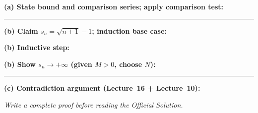 \documentclass[12pt]{article}
\newcommand{\writespace}[1]{\vspace{#1}}
\begin{document}
\newpage

\begin{tcolorbox}[
  enhanced, breakable,
  colback  = pass4purple,
  colframe = purple!55!black,
  fonttitle = \bfseries,
  title = {Pass 4 \enspace\textbf{--}\enspace Skeleton Proof}
]
\noindent\textbf{(a) State bound and comparison series; apply comparison test:}\par
\writespace{2.2cm}

\noindent\rule{\linewidth}{0.4pt}\vspace{2pt}

\noindent\textbf{(b) Claim $s_n = \sqrt{n+1}-1$; induction base case:}\par
\writespace{1.2cm}

\noindent\textbf{(b) Inductive step:}\par
\writespace{1.6cm}

\noindent\textbf{(b) Show $s_n \to +\infty$ (given $M>0$, choose $N$):}\par
\writespace{1.6cm}

\noindent\rule{\linewidth}{0.4pt}\vspace{2pt}

\noindent\textbf{(c) Contradiction argument (Lecture~16 + Lecture~10):}\par
\writespace{1.8cm}
\end{tcolorbox}

\newpage

\begin{tcolorbox}[
  enhanced, breakable,
  colback  = pass5gray,
  colframe = black!38,
  fonttitle = \bfseries,
  title = {Pass 5 \enspace\textbf{--}\enspace Full Proof Attempt}
]
\small\itshape Write a complete proof before reading the Official Solution.\par
\normalfont\normalsize
\writespace{19cm}
\end{tcolorbox}

\newpage
\end{document}
